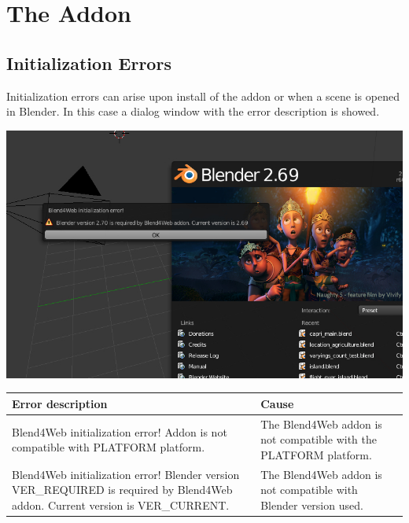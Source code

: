 \documentclass[a4paper,12pt,oneside]{sphinxmanual}
\begin{document}
\chapter{The Addon}
\label{addon:id1}\label{addon::doc}\label{addon:addon}

\section{Initialization Errors}
\label{addon:id2}\label{addon:index-0}\label{addon:initialization-errors}
Initialization errors can arise upon install of the addon or when a scene is opened in Blender. In this case a dialog window with the error description is showed.

{\hfill\includegraphics[width=1.000\linewidth]{init_error_message.jpg}\hfill}

\begin{DUlineblock}{0em}
\item[] 
\end{DUlineblock}

\begin{tabulary}{\linewidth}{|L|L|}
\hline
\textsf{\relax 
Error description
} & \textsf{\relax 
Cause
}\\
\hline
Blend4Web initialization error!
Addon is not compatible with
PLATFORM platform.
 & 
The Blend4Web addon is not compatible with the PLATFORM platform.
\\

Blend4Web initialization error!
Blender version VER\_REQUIRED is
required by Blend4Web addon.
Current version is VER\_CURRENT.
 & 
The Blend4Web addon is not compatible with Blender version used.
\\
\hline\end{tabulary}
\end{document}
